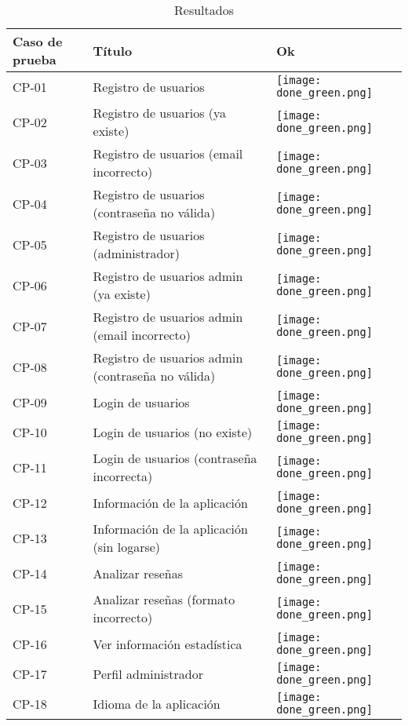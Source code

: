 \begin{table}[p]
	\centering
	\begin{tabularx}{\linewidth}{ p{} p{}  p{}}
		\hline
		\textbf{Caso de prueba} & \textbf{Título} & \textbf{Ok}\\ \hline
		CP-01 & Registro de usuarios & \texttt{[image: done\_green.png]} \\ \hline
		CP-02 & Registro de usuarios (ya existe) &\texttt{[image: done\_green.png]} \\ \hline
		CP-03 & Registro de usuarios (email incorrecto) &\texttt{[image: done\_green.png]} \\ \hline
		CP-04 & Registro de usuarios (contraseña no válida) &\texttt{[image: done\_green.png]} \\ \hline
		CP-05 & Registro de usuarios (administrador) &\texttt{[image: done\_green.png]} \\ \hline
		CP-06 & Registro de usuarios admin (ya existe)&\texttt{[image: done\_green.png]} \\ \hline
		CP-07 & Registro de usuarios admin (email incorrecto) &\texttt{[image: done\_green.png]} \\ \hline
		CP-08 & Registro de usuarios admin (contraseña no válida)&\texttt{[image: done\_green.png]} \\ \hline
		CP-09 & Login de usuarios&\texttt{[image: done\_green.png]} \\ \hline
		CP-10 & Login de usuarios (no existe)&\texttt{[image: done\_green.png]} \\ \hline
		CP-11 & Login de usuarios (contraseña incorrecta) &\texttt{[image: done\_green.png]} \\ \hline
		CP-12 & Información de la aplicación &\texttt{[image: done\_green.png]} \\ \hline
		CP-13 & Información de la aplicación (sin logarse)&\texttt{[image: done\_green.png]} \\ \hline
		CP-14 & Analizar reseñas &\texttt{[image: done\_green.png]} \\ \hline
		CP-15 & Analizar reseñas (formato incorrecto) &\texttt{[image: done\_green.png]} \\ \hline
		CP-16 & Ver información estadística &\texttt{[image: done\_green.png]} \\ \hline
		CP-17 & Perfil administrador&\texttt{[image: done\_green.png]} \\ \hline
		CP-18 & Idioma de la aplicación&\texttt{[image: done\_green.png]} \\ \hline
	\end{tabularx}
	\caption{Resultados}
\end{table}
